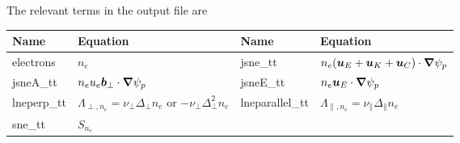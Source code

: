 The relevant terms in the output file are
\begin{longtable}{llll}
\toprule
\rowcolor{gray!50}\textbf{Name} &  \textbf{Equation} & \textbf{Name} &  \textbf{Equation}\\
\midrule
    electrons & $n_e$ &
    jsne\_tt &$ n_e ({\boldsymbol{u}}_E + {\boldsymbol{u}}_K + {\boldsymbol{u}}_C )\cdot{\boldsymbol{\nabla}} \psi_p$ \\
    jsneA\_tt &$ n_e u_e {\boldsymbol{ b}}_\perp  \cdot{\boldsymbol{\nabla}} \psi_p$ &
    jsneE\_tt & $ n_e {\boldsymbol{u}}_E\cdot{\boldsymbol{\nabla}}\psi_p$ \\
    lneperp\_tt &$ \Lambda_{\perp,n_e} = \nu_\perp \Delta_\perp n_e$ or $-\nu_\perp \Delta^2_\perp n_e$ &
    lneparallel\_tt &$ \Lambda_{\parallel,n_e} = \nu_\parallel \Delta_\parallel n_e$ \\
    sne\_tt & $S_{n_e}$ & \\
\bottomrule
\end{longtable}



